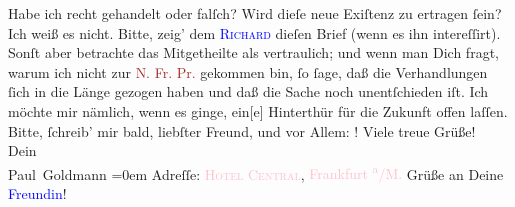            \pstart
           Habe ich recht gehandelt oder falſch? Wird  dieſe neue Exiſtenz zu
               ertragen ſein? Ich weiß es nicht.\pend
           \pstart
           Bitte, zeig’ dem \textsc{\textcolor{blue}{Richard}{}\ledrightnote{\textcolor{blue}{Richard Beer-Hofmann}}} dieſen Brief (wenn es ihn intereſſirt). Sonſt aber betrachte das Mitgetheilte
               als vertraulich; und wenn man  Dich fragt, warum ich
               nicht zur \textcolor{brown}{N. Fr. Pr.}{}\ledrightnote{\textcolor{brown}{Neue Freie Presse}} gekommen bin, ſo  ſage, daß die Verhandlungen
               ſich in die Länge gezogen haben und daß die Sache noch unentſchieden iſt. Ich möchte
               mir nämlich, wenn es ginge, ein{[}e{]} Hinterthür für die Zukunft
               offen laſſen.\pend
           \pstart
           Bitte, ſchreib’ mir bald, liebſter Freund, und vor Allem: \label{K_L02868-45v}\label{K_L02868-45h}!\pend
           \pstart
           Viele treue Grüße! {\\[\baselineskip]}Dein {\\[\baselineskip]}\spacefill\mbox{Paul Goldmann}\pend
           \leftskip=0em{}\pstart
           \noindent{}Adreſſe: \textsc{\textcolor{pink}{Hotel Central}{}\ledrightnote{\textcolor{pink}{Central-Hotel}}}, \textcolor{pink}{Frankfurt \textsuperscript{a}/M.}{}\ledrightnote{\textcolor{pink}{Frankfurt am Main}}\pend
           \pstart
           Grüße an Deine \textcolor{blue}{Freundin}{}!\pend
           \endnumbering{}\begin{anhang}\end{anhang}
      